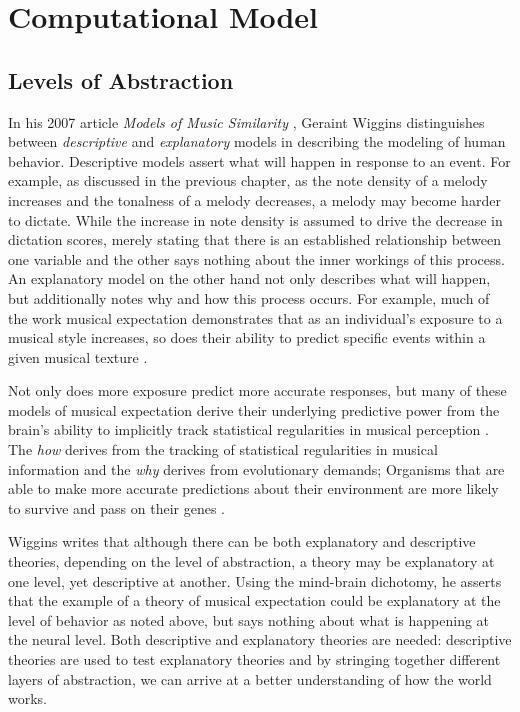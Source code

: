\documentclass[]{book}
\begin{document}
\hypertarget{computational-model}{%
\chapter{Computational Model}\label{computational-model}}

\hypertarget{levels-of-abstraction}{%
\section{Levels of Abstraction}\label{levels-of-abstraction}}

In his 2007 article \emph{Models of Music Similarity} \citep{wigginsModelsMusicalSimilarity2007}, Geraint Wiggins distinguishes between \emph{descriptive} and \emph{explanatory} models in describing the modeling of human behavior.
Descriptive models assert what will happen in response to an event.
For example, as discussed in the previous chapter, as the note density of a melody increases and the tonalness of a melody decreases, a melody may become harder to dictate.
While the increase in note density is assumed to drive the decrease in dictation scores, merely stating that there is an established relationship between one variable and the other says nothing about the inner workings of this process.
An explanatory model on the other hand not only describes what will happen, but additionally notes why and how this process occurs.
For example, much of the work musical expectation demonstrates that as an individual's exposure to a musical style increases, so does their ability to predict specific events within a given musical texture \citep{pearceStatisticalLearningProbabilistic2018a}.

Not only does more exposure predict more accurate responses, but many of these models of musical expectation derive their underlying predictive power from the brain's ability to implicitly track statistical regularities in musical perception \citep{saffranStatisticalLearningTone1999, margulisRepeatHowMusic2014}.
The \emph{how} derives from the tracking of statistical regularities in musical information and the \emph{why} derives from evolutionary demands; Organisms that are able to make more accurate predictions about their environment are more likely to survive and pass on their genes \citep{huronSweetAnticipation2006}.

Wiggins writes that although there can be both explanatory and descriptive theories, depending on the level of abstraction, a theory may be explanatory at one level, yet descriptive at another.
Using the mind-brain dichotomy, he asserts that the example of a theory of musical expectation could be explanatory at the level of behavior as noted above, but says nothing about what is happening at the neural level.
Both descriptive and explanatory theories are needed: descriptive theories are used to test explanatory theories and by stringing together different layers of abstraction, we can arrive at a better understanding of how the world works.
\end{document}
